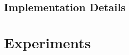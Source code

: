 \documentclass[10pt,twocolumn,letterpaper]{article}
\begin{document}
 
%			


\subsection{Implementation Details}

\section{Experiments}
\end{document}
